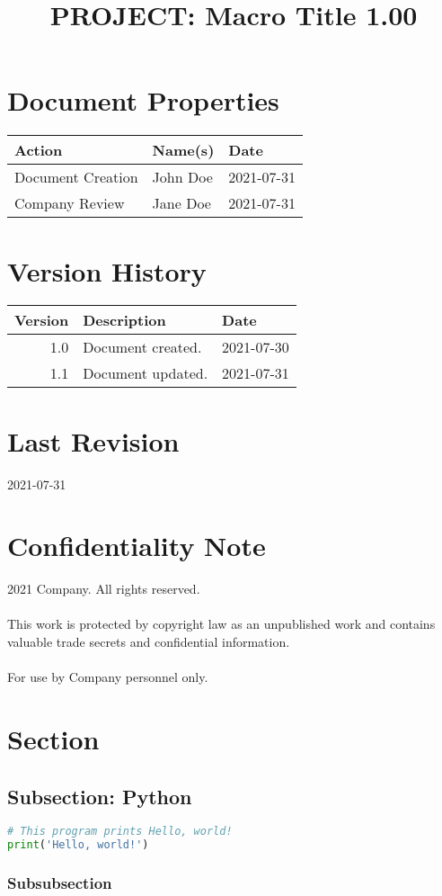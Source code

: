 \documentclass[10pt,a4paper]{hitec}
\title{PROJECT: Macro Title 1.00}
\date{}
\begin{document}
\maketitle

\section*{Document Properties}

\begin{tabular}{ | l | l | l |}
\hline
\textbf{Action} & \textbf{Name(s)} & \textbf{Date} \\ \hline
Document Creation & John Doe & 2021-07-31 \\ \hline
Company Review & Jane Doe & 2021-07-31 \\
\hline
\end{tabular}

\section*{Version History}

\begin{tabular}{ | r | p{5cm} | l |}
\hline
\textbf{Version} & \textbf{Description} & \textbf{Date} \\ \hline
1.0 & Document created. & 2021-07-30 \\ \hline %
1.1 & Document updated. & 2021-07-31 \\
\hline
\end{tabular}


\section*{Last Revision}

2021-07-31

\section*{Confidentiality Note}

2021 Company. All rights reserved.\\
\\
This work is protected by copyright law as an unpublished work and contains valuable trade secrets and confidential information.\\
\\
For use by Company personnel only.

\newpage

\tableofcontents

\newpage

\section{Section}

\subsection{Subsection: Python}

\begin{lstlisting}[language = Python]
# This program prints Hello, world!
print('Hello, world!')
\end{lstlisting}

\subsubsection{Subsubsection}
\end{document}

